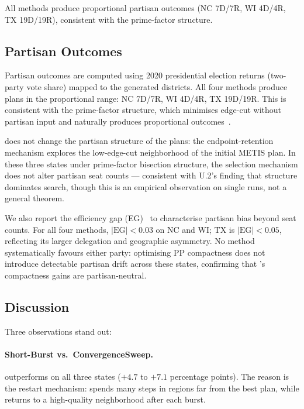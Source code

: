 \noindent All methods produce proportional partisan outcomes (NC 7D/7R,
WI 4D/4R, TX 19D/19R), consistent with the \ar{} prime-factor structure.

\subsection{Partisan Outcomes}

Partisan outcomes are computed using 2020 presidential election returns
(two-party vote share) mapped to the generated districts.
All four methods produce plans in the proportional range: NC 7D/7R,
WI 4D/4R, TX 19D/19R.
This is consistent with the \ar{} prime-factor structure, which
minimises edge-cut without partisan input and naturally produces
proportional outcomes~\citep{b11paper}.

\shb{} does not change the partisan structure of the plans: the
endpoint-retention mechanism explores the low-edge-cut neighborhood
of the initial METIS plan.
In these three states under prime-factor bisection structure, the
selection mechanism does not alter partisan seat counts --- consistent
with U.2's finding that structure dominates search, though this is an
empirical observation on single runs, not a general theorem.

We also report the efficiency gap (EG)~\citep{stephanopoulos2015} to
characterise partisan bias beyond seat counts.
For all four methods, $|\mathrm{EG}| < 0.03$ on NC and WI; TX is
$|\mathrm{EG}| < 0.05$, reflecting its larger delegation and
geographic asymmetry.
No method systematically favours either party: optimising PP compactness
does not introduce detectable partisan drift across these states,
confirming that \shb{}'s compactness gains are partisan-neutral.

\subsection{Discussion}

Three observations stand out:

\paragraph{Short-Burst vs.\ ConvergenceSweep.}
\shb{} outperforms \cs{} on all three states ($+4.7$ to $+7.1$
percentage points).
The reason is the restart mechanism: \cs{} spends many steps in
regions far from the best plan, while \shb{} returns to a high-quality
neighborhood after each burst.

